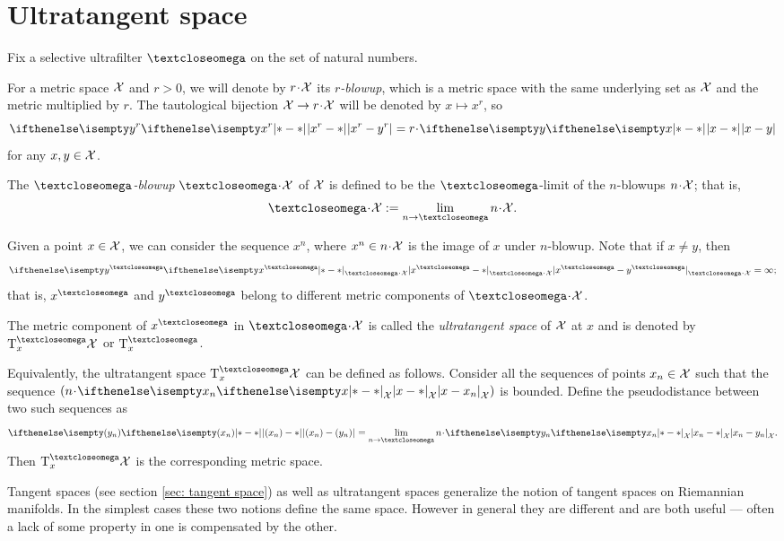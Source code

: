 \section{Ultratangent space}
\label{sec: ultradiff}

Fix a selective ultrafilter $\o$ on the set of natural numbers.

For a metric space $\mathcal{X}$ and $r>0$,
we will denote by $r\cdot\spc{X}$ its \emph{$r$-blowup},
which is a metric space with the same underlying set as $\mathcal{X}$ and the metric multiplied by $r$.
The tautological bijection $\spc{X}\to r\cdot\spc{X}$ will be denoted by $x\mapsto x^r$, 
so 
\[\dist{x^r}{y^r}{}
=
r\cdot\dist[{{}}]{x}{y}{}\] 
for any $x,y\in \spc{X}$.

The \emph{$\o$-blowup} $\o\cdot\spc{X}$ of $\mathcal{X}$ is defined to be the $\o$-limit
of the $n$-blowups $n\cdot\spc{X}$; that is,
\[\o\cdot\spc{X}
\df
\lim_{n\to\o} n\cdot\spc{X}.\]

Given a point $x\in \spc{X}$, we can consider the sequence $x^n$, where $x^n\in n\cdot\spc{X}$ is the image of $x$ under $n$-blowup.
Note that if $x\ne y$, then 
\[\dist{x^\o}{y^\o}{\o\cdot\spc{X}}=\infty;\]
that is, 
$x^\o$ and $y^\o$ 
belong to different metric components of $\o\cdot\spc{X}$.

The metric component of $x^\o$ in $\o\cdot\spc{X}$ is called the \emph{ultratangent space} of $\mathcal{X}$ at $x$ and  is denoted by $\T^\o_x\spc{X}$ or $\T^\o_x$.

Equivalently, the ultratangent space $\T^\o_x\spc{X}$ can be defined as follows.
Consider all the sequences of points $x_n\in \spc{X}$ such that the sequence 
 $(n\cdot\dist{x}{x_n}{\spc{X}})$ is bounded.
Define the pseudodistance between two such sequences as 
\[\dist{(x_n)}{(y_n)}{}
=
\lim_{n\to\o}n\cdot\dist{x_n}{y_n}{\spc{X}}.\]
Then $\T^\o_x\spc{X}$ is the corresponding metric space.

Tangent spaces (see section \ref{sec: tangent space}) as well as ultratangent spaces 
generalize the notion of tangent spaces on Riemannian manifolds.
In  the simplest cases these two notions define the same space.
However in general they are different and are both useful ---
often a lack of some property in one is compensated by the other.%

